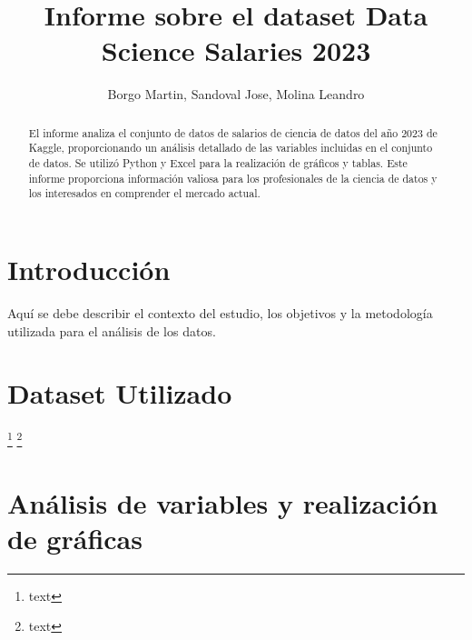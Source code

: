 \documentclass{article}
\title{Informe sobre el dataset Data Science Salaries 2023}
\author{Borgo Martin, Sandoval Jose, Molina Leandro}
\begin{document}
	
	\maketitle
	\begin{abstract}
		El informe analiza el conjunto de datos de salarios de ciencia de datos del año 2023 de Kaggle, proporcionando un análisis detallado de las variables incluidas en el conjunto de datos. Se utilizó Python y Excel para la realización de gráficos y tablas. Este informe proporciona información valiosa para los profesionales de la ciencia de datos y los interesados en comprender el mercado actual.
	\end{abstract}
	\pagebreak
	\vspace{-20pt}
	
	\noindent
	\tableofcontents
	\pagebreak
	\section{Introducción}
	
	Aquí se debe describir el contexto del estudio, los objetivos y la metodología utilizada para el análisis de los datos.
	
	\section{Dataset Utilizado}
	\footnote{text}
	\footnote{text}
	
	\section{Análisis de variables y realización de gráficas}
\end{document}
